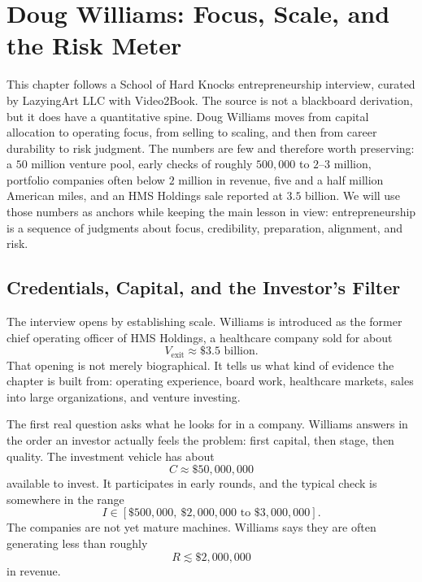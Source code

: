 \chapter{Doug Williams: Focus, Scale, and the Risk Meter}

This chapter follows a School of Hard Knocks entrepreneurship interview, curated by LazyingArt LLC with Video2Book. The source is not a blackboard derivation, but it does have a quantitative spine. Doug Williams moves from capital allocation to operating focus, from selling to scaling, and then from career durability to risk judgment. The numbers are few and therefore worth preserving: a $50$ million venture pool, early checks of roughly $500{,}000$ to $2$--$3$ million, portfolio companies often below $2$ million in revenue, five and a half million American miles, and an HMS Holdings sale reported at $3.5$ billion. We will use those numbers as anchors while keeping the main lesson in view: entrepreneurship is a sequence of judgments about focus, credibility, preparation, alignment, and risk.

\section{Credentials, Capital, and the Investor's Filter}

The interview opens by establishing scale. Williams is introduced as the former chief operating officer of HMS Holdings, a healthcare company sold for about
\begin{equation}
V_{\mathrm{exit}} \approx \$3.5\text{ billion}.
\end{equation}
That opening is not merely biographical. It tells us what kind of evidence the chapter is built from: operating experience, board work, healthcare markets, sales into large organizations, and venture investing.

The first real question asks what he looks for in a company. Williams answers in the order an investor actually feels the problem: first capital, then stage, then quality. The investment vehicle has about
\begin{equation}
C \approx \$50{,}000{,}000
\end{equation}
available to invest. It participates in early rounds, and the typical check is somewhere in the range
\begin{equation}
I \in [\$500{,}000,\ \$2{,}000{,}000\text{ to }\$3{,}000{,}000].
\end{equation}
The companies are not yet mature machines. Williams says they are often generating less than roughly
\begin{equation}
R \lesssim \$2{,}000{,}000
\end{equation}
in revenue.

